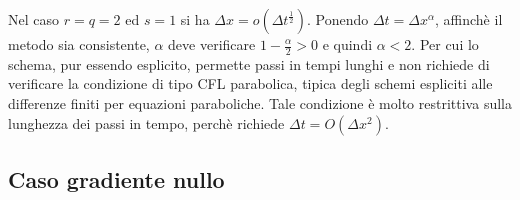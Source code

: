 \begin{osservazione}
Nel caso $r=q=2$ ed $s=1$ si ha $\Delta x=o(\Delta
t^{\frac{1}{2}})$. Ponendo $\Delta t = \Delta x^{\alpha}$, affinchè il
metodo sia consistente, $\alpha$ deve verificare
$1-\frac{\alpha}{2}>0$ e quindi $\alpha < 2$. Per cui lo schema, pur
essendo esplicito, permette passi in tempi lunghi e non richiede di
verificare la condizione di tipo CFL parabolica, tipica degli schemi
espliciti alle differenze finiti per equazioni paraboliche. Tale
condizione è molto restrittiva sulla lunghezza dei passi in tempo,
perchè richiede $\Delta t=O(\Delta x^2)$.
\end{osservazione}
%
\subsection{Caso gradiente nullo}

